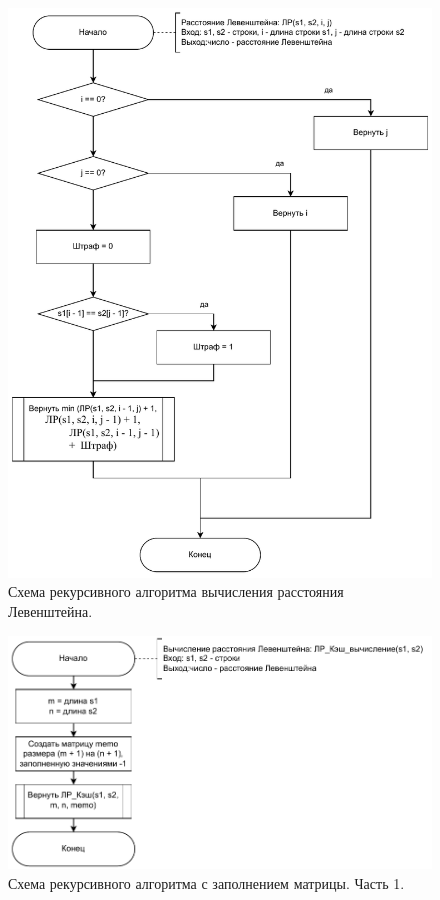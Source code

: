 \begin{figure}[H]
    \centering
    \includegraphics[width=170mm]{images/l_recursive}
    \caption{Схема рекурсивного алгоритма вычисления расстояния Левенштейна.}
    \label{images:l_recursive}
\end{figure}

\begin{figure}[H]
    \centering
    \includegraphics[width=170mm]{images/l_recursive_cache_part1}
    \caption{Схема рекурсивного алгоритма с заполнением матрицы. Часть 1.}
    \label{images:l_recursive_cache_part1}
\end{figure}

